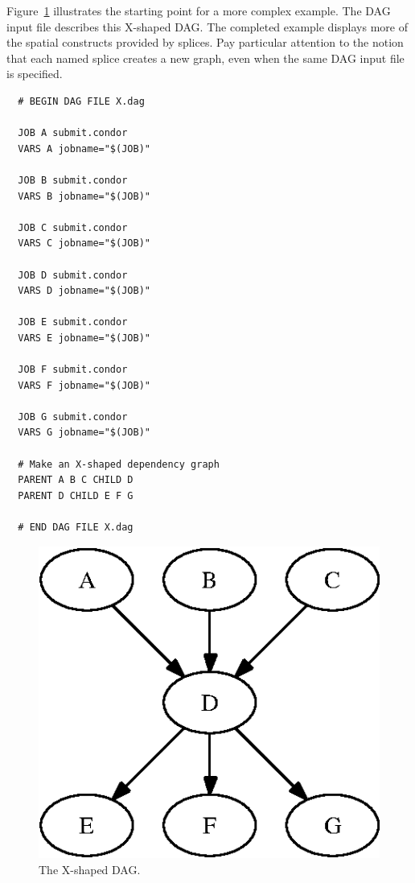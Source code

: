 Figure~\ref{fig:dagman-splice-X} illustrates the starting point
for a more complex example.
The DAG input file  describes this X-shaped DAG.
The completed example displays more of
the spatial constructs provided by splices.
Pay particular attention to the notion that each named splice creates a
new graph, even when the same DAG input file is specified.


\begin{verbatim}
  # BEGIN DAG FILE X.dag

  JOB A submit.condor
  VARS A jobname="$(JOB)"

  JOB B submit.condor
  VARS B jobname="$(JOB)"

  JOB C submit.condor
  VARS C jobname="$(JOB)"

  JOB D submit.condor
  VARS D jobname="$(JOB)"

  JOB E submit.condor
  VARS E jobname="$(JOB)"

  JOB F submit.condor
  VARS F jobname="$(JOB)"

  JOB G submit.condor
  VARS G jobname="$(JOB)"

  # Make an X-shaped dependency graph
  PARENT A B C CHILD D
  PARENT D CHILD E F G

  # END DAG FILE X.dag
\end{verbatim}

\begin{figure}
\centering
\includegraphics{user-man/splice-X}
\caption{\label{fig:dagman-splice-X} The X-shaped DAG.}
\end{figure}


